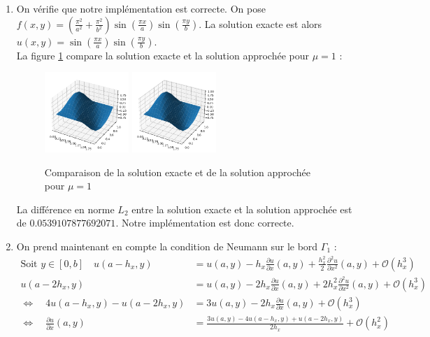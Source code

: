 \documentclass[12pt,a4paper]{article}
\begin{document}
\begin{enumerate}[resume]
    \item On vérifie que notre implémentation est correcte.
    On pose $f(x, y) = \left( \frac{\pi^2}{a^2} + \frac{\pi^2}{b^2} \right) \sin\left( \frac{\pi x}{a} \right) \sin\left( \frac{\pi y}{b} \right)$.
    La solution exacte est alors $u(x, y) = \sin\left( \frac{\pi x}{a} \right) \sin\left( \frac{\pi y}{b} \right)$. \\
    La figure \ref{fig:1} compare la solution exacte et la solution approchée pour $\mu = 1$ :\\
    \begin{figure}[ht]
        \centering
        \includegraphics[width=0.3\textwidth]{src/1.png}
        \hspace{1cm}
        \includegraphics[width=0.3\textwidth]{src/2.png}
        \caption{Comparaison de la solution exacte et de la solution approchée pour $\mu = 1$}
        \label{fig:1}
    \end{figure}

    \newpage
    La différence en norme $L_2$ entre la solution exacte et la solution approchée est de $0.0539107877692071$. Notre implémentation est donc correcte.\\

    \item On prend maintenant en compte la condition de Neumann sur le bord $\Gamma_1$ :
    \begin{align*}
        \text{Soit } y \in [0, b] \quad u(a - h_x, y) &= u(a, y) - h_x \frac{\partial u}{\partial x}(a, y) + \frac{h_x^2}{2} \frac{\partial^2 u}{\partial x^2}(a, y) + \mathcal{O}(h_x^3) \\
        u(a - 2h_x, y) &= u(a, y) - 2h_x \frac{\partial u}{\partial x}(a, y) + 2h_x^2 \frac{\partial^2 u}{\partial x^2}(a, y) + \mathcal{O}(h_x^3) \\
        \Leftrightarrow \quad 4u(a - h_x, y) - u(a - 2h_x, y) &= 3u(a, y) - 2h_x \frac{\partial u}{\partial x}(a, y) + \mathcal{O}(h_x^3) \\
        \Leftrightarrow \quad \frac{\partial u}{\partial x}(a, y) &= \frac{3u(a, y) - 4u(a - h_x, y) + u(a - 2h_x, y)}{2h_x} + \mathcal{O}(h_x^2)
    \end{align*}


\end{enumerate}
\end{document}
